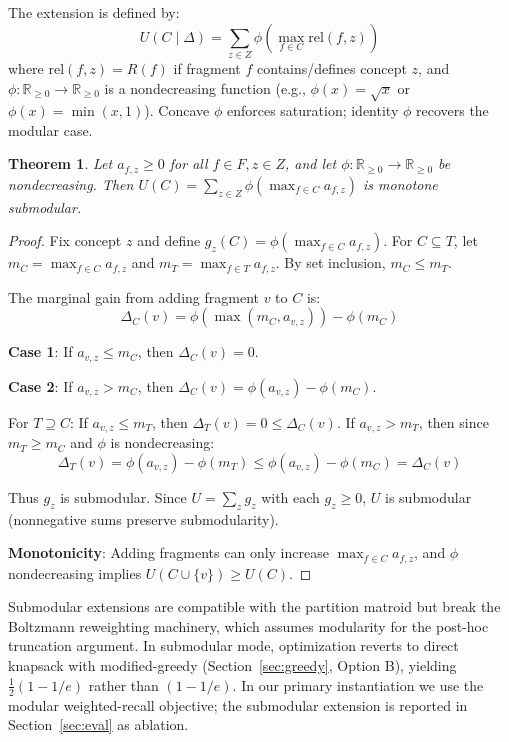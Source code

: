 \documentclass[11pt, a4paper]{article}
\newtheorem{theorem}{Theorem}
\begin{document}
The extension is defined by:
\begin{equation}
    U(C \mid \Delta) = \sum_{z \in Z} \phi\left(\max_{f \in C} \text{rel}(f, z)\right)
\end{equation}
where $\text{rel}(f, z) = R(f)$ if fragment $f$ contains/defines concept $z$, and $\phi: \mathbb{R}_{\geq 0} \to \mathbb{R}_{\geq 0}$ is a nondecreasing function (e.g., $\phi(x) = \sqrt{x}$ or $\phi(x) = \min(x, 1)$). Concave $\phi$ enforces saturation; identity $\phi$ recovers the modular case.

\begin{theorem}
Let $a_{f,z} \geq 0$ for all $f \in F, z \in Z$, and let $\phi: \mathbb{R}_{\geq 0} \to \mathbb{R}_{\geq 0}$ be nondecreasing. Then $U(C) = \sum_{z \in Z} \phi(\max_{f \in C} a_{f,z})$ is monotone submodular.
\end{theorem}

\begin{proof}
Fix concept $z$ and define $g_z(C) = \phi(\max_{f \in C} a_{f,z})$. For $C \subseteq T$, let $m_C = \max_{f \in C} a_{f,z}$ and $m_T = \max_{f \in T} a_{f,z}$. By set inclusion, $m_C \leq m_T$.

The marginal gain from adding fragment $v$ to $C$ is:
\[
\Delta_C(v) = \phi(\max(m_C, a_{v,z})) - \phi(m_C)
\]

\textbf{Case 1}: If $a_{v,z} \leq m_C$, then $\Delta_C(v) = 0$.

\textbf{Case 2}: If $a_{v,z} > m_C$, then $\Delta_C(v) = \phi(a_{v,z}) - \phi(m_C)$.

For $T \supseteq C$: If $a_{v,z} \leq m_T$, then $\Delta_T(v) = 0 \leq \Delta_C(v)$. If $a_{v,z} > m_T$, then since $m_T \geq m_C$ and $\phi$ is nondecreasing:
\[
\Delta_T(v) = \phi(a_{v,z}) - \phi(m_T) \leq \phi(a_{v,z}) - \phi(m_C) = \Delta_C(v)
\]

Thus $g_z$ is submodular. Since $U = \sum_z g_z$ with each $g_z \geq 0$, $U$ is submodular (nonnegative sums preserve submodularity).

\textbf{Monotonicity}: Adding fragments can only increase $\max_{f \in C} a_{f,z}$, and $\phi$ nondecreasing implies $U(C \cup \{v\}) \geq U(C)$.
\end{proof}

Submodular extensions are compatible with the partition matroid but break the Boltzmann reweighting machinery, which assumes modularity for the post-hoc truncation argument. In submodular mode, optimization reverts to direct knapsack with modified-greedy (Section~\ref{sec:greedy}, Option B), yielding $\frac{1}{2}(1-1/e)$ rather than $(1-1/e)$. In our primary instantiation we use the modular weighted-recall objective; the submodular extension is reported in Section~\ref{sec:eval} as ablation.
\end{document}
